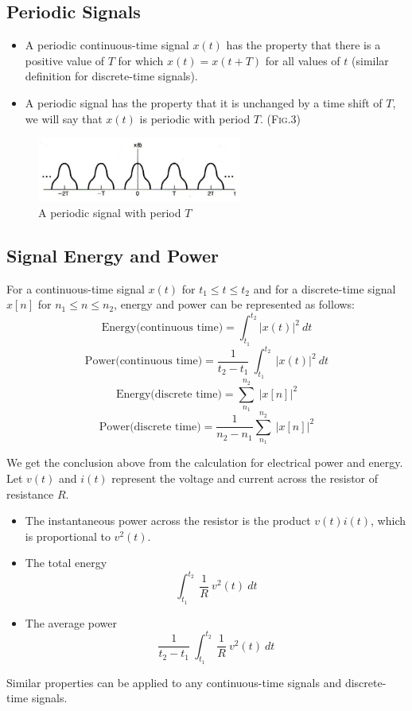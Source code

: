 \documentclass[12pt,a4paper]{article}
\begin{document}
\subsection{Periodic Signals}
 \begin{itemize}
 \item A periodic continuous-time signal $x(t)$ has the property that there is a positive value of $T$ for which $x(t) = x(t+T)$ for all values of $t$ (similar definition for discrete-time signals).
 \item A periodic signal has the property that it is unchanged by a time shift of $T$, we will say that $x(t)$ is periodic with period $T$. (\textsc{Fig.3})
 \end{itemize}
 \begin{figure}[H]\centering
 \includegraphics[width = 0.6\textwidth]{images/1.5}
 \caption{A periodic signal with period $T$}
 \end{figure}

\subsection{Signal Energy and Power}
For a continuous-time signal $x(t)$ for $t_1 \leq t \leq t_2$ and for a discrete-time signal $x[n]$ for $n_1 \leq n \leq n_2$, energy and power can be represented as follows:
\[ \text{Energy(continuous time)} = \int_{t_1}^{t_2} \lvert x(t) \rvert^2 \ dt \]
\[ \text{Power(continuous  time)} = \frac{1}{t_2 - t_1} \ \int_{t_1}^{t_2} \ \lvert x(t) \rvert^2 \ dt \]
\[ \text{Energy(discrete time)} = \sum_{n_1}^{n_2} \ \lvert x[n] \rvert ^2 \]
\[ \text{Power(discrete time)} = \frac{1}{n_2 - n_1} \sum_{n_1}^{n_2} \ \lvert x[n] \rvert ^2 \]

\begin{tcolorbox}[breakable]
  We get the conclusion above from the calculation for electrical power and energy.
  Let $v(t)$ and $i(t)$ represent the voltage and current across the resistor of resistance $R$. 
 \begin{itemize}
  \item The instantaneous power across the resistor is the product $v(t)i(t)$, which is proportional to $v^2(t)$.
  \item The total energy \[ \int_{t_1}^{t_2} \ \frac{1}{R} \ v^2(t) \ dt \] 
  \item The average power \[ \frac{1}{t_2 - t_1} \ \int_{t_1}^{t_2} \ \frac{1}{R} \ v^2(t) \ dt \]
  \end{itemize}
  Similar properties can be applied to any continuous-time signals and discrete-time signals.
\end{tcolorbox}
  
\end{document}

